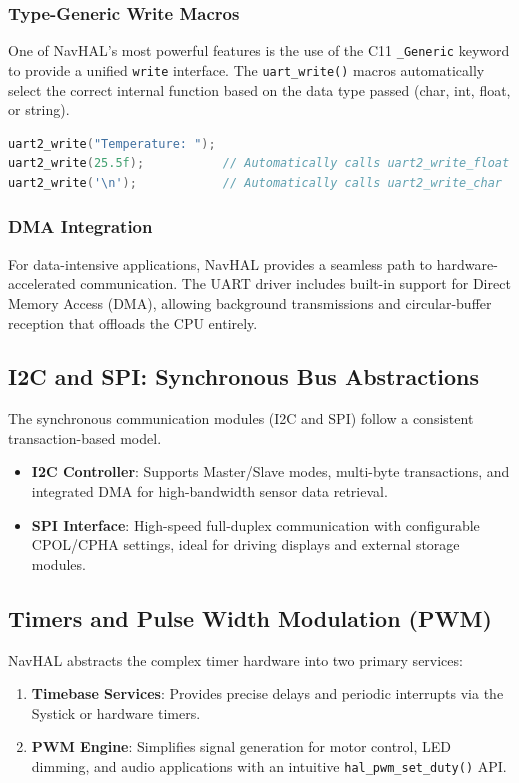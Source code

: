 \subsubsection{Type-Generic Write Macros}
One of NavHAL's most powerful features is the use of the C11 \texttt{\_Generic} keyword to provide a unified \texttt{write} interface. The \texttt{uart\_write()} macros automatically select the correct internal function based on the data type passed (char, int, float, or string).

\begin{lstlisting}[language=C, caption=Type-Generic UART Transmission]
uart2_write("Temperature: "); 
uart2_write(25.5f);           // Automatically calls uart2_write_float
uart2_write('\n');            // Automatically calls uart2_write_char
\end{lstlisting}

\subsubsection{DMA Integration}
For data-intensive applications, NavHAL provides a seamless path to hardware-accelerated communication. The UART driver includes built-in support for Direct Memory Access (DMA), allowing background transmissions and circular-buffer reception that offloads the CPU entirely.

\subsection{I2C and SPI: Synchronous Bus Abstractions}
The synchronous communication modules (I2C and SPI) follow a consistent transaction-based model.

\begin{itemize}
    \item \textbf{I2C Controller}: Supports Master/Slave modes, multi-byte transactions, and integrated DMA for high-bandwidth sensor data retrieval.
    \item \textbf{SPI Interface}: High-speed full-duplex communication with configurable CPOL/CPHA settings, ideal for driving displays and external storage modules.
\end{itemize}

\subsection{Timers and Pulse Width Modulation (PWM)}
NavHAL abstracts the complex timer hardware into two primary services:
\begin{enumerate}
    \item \textbf{Timebase Services}: Provides precise delays and periodic interrupts via the Systick or hardware timers.
    \item \textbf{PWM Engine}: Simplifies signal generation for motor control, LED dimming, and audio applications with an intuitive \texttt{hal\_pwm\_set\_duty()} API.
\end{enumerate}

